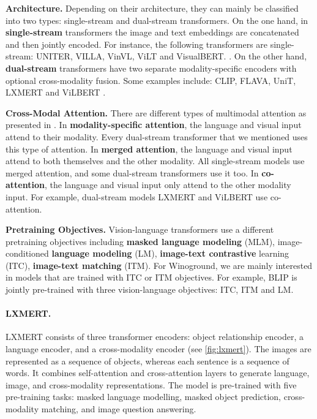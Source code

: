 \textbf{Architecture.} Depending on their architecture, they can mainly be classified into two types: single-stream and dual-stream transformers. On the one hand, in \textbf{single-stream} transformers the image and text embeddings are concatenated and then jointly encoded. For instance, the following transformers are single-stream: UNITER, VILLA, VinVL, ViLT and VisualBERT. \cite{chen2020uniter, gan2020villa, zhang2021vinvl, kim2021vilt, li2019visualbert}. On the other hand, \textbf{dual-stream} transformers have two separate modality-specific encoders with optional cross-modality fusion. Some examples include: CLIP, FLAVA, UniT, LXMERT and ViLBERT \cite{radford2021clip, singh2022flava, hu2021unit, tan2020lxmert, lu2019vilbert}.

\textbf{Cross-Modal Attention.} There are different types of multimodal attention as presented in \cite{hendricks2021decoupling}. In \textbf{modality-specific attention}, the language and visual input attend to their modality. Every dual-stream transformer that we mentioned uses this type of attention. In \textbf{merged attention}, the language and visual input attend to both themselves and the other modality. All single-stream models use merged attention, and some dual-stream transformers use it too. In \textbf{co-attention}, the language and visual input only attend to the other modality input. For example, dual-stream models LXMERT and ViLBERT use co-attention.

\textbf{Pretraining Objectives.} Vision-language transformers use a different pretraining objectives including \textbf{masked language modeling} (MLM), image-conditioned \textbf{language modeling} (LM), \textbf{image-text contrastive} learning (ITC), \textbf{image-text matching} (ITM). For Winoground, we are mainly interested in models that are trained with ITC or ITM objectives. For example, BLIP \cite{li2022blip} is jointly pre-trained with three vision-language objectives: ITC, ITM and LM.

\paragraph{LXMERT.} LXMERT \cite{tan2020lxmert} consists of  three transformer encoders: object relationship encoder, a language encoder, and a cross-modality encoder (see \cref{fig:lxmert}). The images are represented as a sequence of objects, whereas each sentence is a sequence of words. It combines self-attention and cross-attention layers to generate language, image, and cross-modality representations. The model is pre-trained with five pre-training tasks: masked language modelling, masked object prediction, cross-modality matching, and image question answering.

